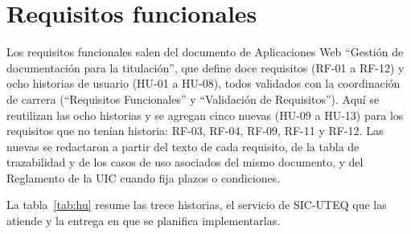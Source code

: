 \section{Requisitos funcionales}\label{sec:rf}

Los requisitos funcionales salen del documento de Aplicaciones Web \enquote{Gestión de documentación para la titulación}, que define doce requisitos (RF-01 a RF-12) y ocho historias de usuario (HU-01 a HU-08), todos validados con la coordinación de carrera (\enquote{Requisitos Funcionales} y \enquote{Validación de Requisitos}). Aquí se reutilizan las ocho historias y se agregan cinco nuevas (HU-09 a HU-13) para los requisitos que no tenían historia: RF-03, RF-04, RF-09, RF-11 y RF-12. Las nuevas se redactaron a partir del texto de cada requisito, de la tabla de trazabilidad y de los casos de uso asociados del mismo documento, y del Reglamento de la UIC cuando fija plazos o condiciones.

La tabla~\ref{tab:hu} resume las trece historias, el servicio de SIC-UTEQ que las atiende y la entrega en que se planifica implementarlas.

